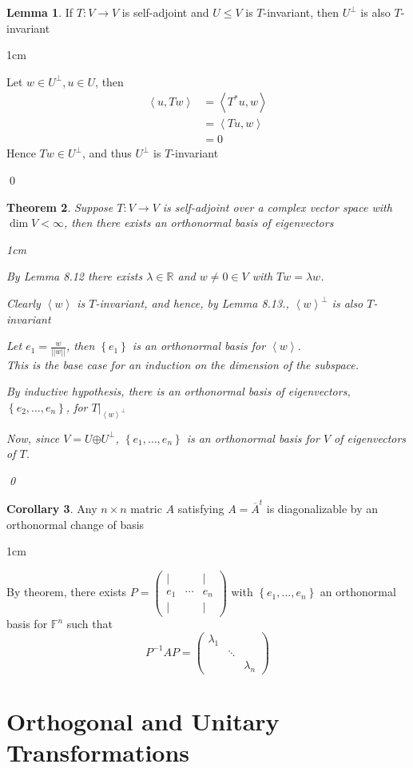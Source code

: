 \documentclass[11pt, a4paper]{report}
\makeatletter
\numberwithin{equation}{section}
\newcommand{\opl}{\boldsymbol{\oplus}}
\newcommand{\R}{\mathbb{R}}
\newcommand{\F}{\mathbb{F}}
\newcommand{\spn}[1]{\left\langle #1 \right\rangle}
\newcommand{\sett}[1]{\left\lbrace #1 \right\rbrace}
\newcommand{\pmx}[1]{\begin{pmatrix}#1\end{pmatrix}}
\numberwithin{equation}{subsection}
\theoremstyle{plain}
\newtheorem{thm}{Theorem}[chapter] %
\theoremstyle{definition}
\newtheorem{lem}[thm]{Lemma}
\newtheorem{cor}[thm]{Corollary}
\theoremstyle{remark}
\newtheorem*{prf}{Proof}
\renewenvironment{prf}[1][\proofname]{\par
  \vspace{-\topsep}%
  \normalfont
  \topsep0pt \partopsep0pt %
  \trivlist
  \item[\hskip\labelsep
        \itshape
    #1\@addpunct{.}]\ignorespaces
}{%
  \popQED\endtrivlist\@endpefalse
  \addvspace{6pt plus 6pt} %
}
\newcommand{\pr}[1]{\begin{adjustwidth}{1cm}{} \begin{prf} #1 \end{prf} \end{adjustwidth}}
\makeatother
\begin{document}
\begin{lem}
If $T: V \to V$ is self-adjoint and $U \leq V$ is $T$-invariant, then $U^\perp$ is also $T$-invariant
\pr{Let $w \in U^\perp, u \in U$, then
\begin{align*}
\spn{u, Tw}	&= \spn{T^*u, w} \tag{definition of adjoint}\\
			&= \spn{Tu, w} \tag{$T$ self-adjoint}\\
			&= 0 \tag{$Tu \in U, w \in U^\perp$}
\end{align*}
Hence $Tw \in U^\perp$, and thus $U^\perp$ is $T$-invariant
}\qed
\end{lem}

\newpage

\begin{thm}
Suppose $T: V \to V$ is self-adjoint over a complex vector space with $\dim V < \infty$, then there exists an orthonormal basis of eigenvectors
\pr{
By Lemma 8.12 there exists $\lambda \in \R$ and $w \neq 0 \in V$ with $Tw = \lambda w$.

Clearly $\spn{w}$ is $T$-invariant, and hence, by Lemma 8.13., $\spn{w}^\perp$ is also $T$-invariant

Let $e_1 = \frac{w}{||w||}$, then $\sett{e_1}$ is an orthonormal basis for $\spn{w}$.\\ This is the base case for an induction on the dimension of the subspace.

By inductive hypothesis, there is an orthonormal basis of eigenvectors, $\sett{e_2, \ldots, e_n}$, for $T|_{\spn{w}^\perp}$

Now, since $V = U \opl U^\perp$, $\sett{e_1, \ldots, e_n}$ is an orthonormal basis for $V$ of eigenvectors of $T$.
}\qed
\end{thm}

\begin{cor}
Any $n \times n$ matric $A$ satisfying $A = \overline{A}^t$ is diagonalizable by an orthonormal change of basis
\pr{
By theorem, there exists $P = \pmx{| & & |\\e_1 & \cdots & e_n\\| & & |}$ with $\sett{e_1, \ldots, e_n}$ an orthonormal basis for $\F^n$ such that\\
$$P^{-1}AP = \pmx{\lambda_1\\ & \ddots\\ && \lambda_n}$$
}
\end{cor}

\section{Orthogonal and Unitary Transformations}
\end{document}
